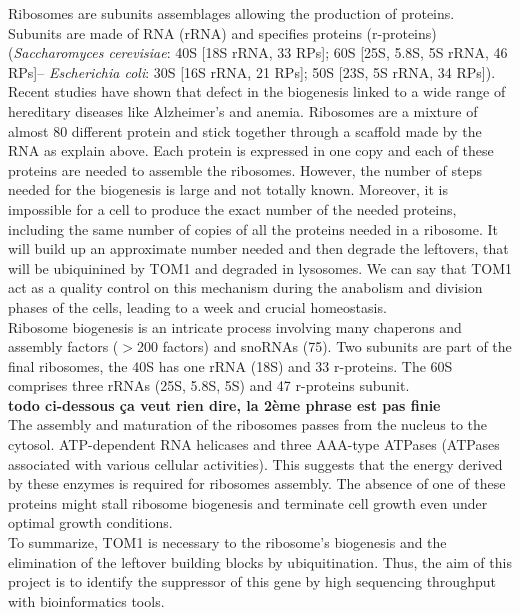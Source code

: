 \documentclass[10pt,a4paper]{article}
\begin{document}
\noindent Ribosomes are subunits assemblages allowing the production of proteins. Subunits are made of RNA (rRNA) and specifies proteins (r-proteins) (\textit{Saccharomyces cerevisiae}: 40S [18S rRNA, 33 RPs]; 60S [25S, 5.8S, 5S rRNA, 46 RPs]– \textit{Escherichia coli}: 30S [16S rRNA, 21 RPs]; 50S [23S, 5S rRNA, 34 RPs])\cite{kressler_driving_2010}. Recent studies have shown that defect in the biogenesis linked to a wide range of hereditary diseases like Alzheimer’s and anemia\cite{makioka_immunolocalization_2016}. Ribosomes are a mixture of almost 80 different protein and stick together through a scaffold made by the RNA as explain above. Each protein is expressed in one copy and each of these proteins are needed to assemble the ribosomes. However, the number of steps needed for the biogenesis is large and not totally known. Moreover, it is impossible for a cell to produce the exact number of the needed proteins, including the same number of copies of all the proteins needed in a ribosome\cite{sung_conserved_2016}. It will build up an approximate number needed and then degrade the leftovers, that will be ubiquinined by TOM1 and degraded in lysosomes. We can say that TOM1 act as a quality control on this mechanism during the anabolism and division phases of the cells, leading to a week and crucial homeostasis\cite{sung_conserved_2016}.\\

\noindent Ribosome biogenesis is an intricate process involving many chaperons and assembly factors ($>$200 factors) and snoRNAs (75)\cite{kressler_driving_2010}. Two subunits are part of the final ribosomes, the 40S has one rRNA (18S) and 33 r-proteins. The 60S comprises three rRNAs (25S, 5.8S, 5S) and 47 r-proteins subunit\cite{kressler_driving_2010}.\\

\textbf{todo ci-dessous ça veut rien dire, la 2ème phrase est pas finie}\\

\noindent The assembly and maturation of the ribosomes passes from the nucleus to the cytosol. ATP-dependent RNA helicases and three AAA-type ATPases (ATPases associated with various cellular activities). This suggests that the energy derived by these enzymes is required for ribosomes assembly. The absence of one of these proteins might stall ribosome biogenesis and terminate cell growth even under optimal growth conditions\cite{dinman_eukaryotic_2009,kressler_driving_2010}.\\

\noindent To summarize, TOM1 is necessary to the ribosome’s biogenesis and the elimination of the leftover building blocks by ubiquitination. Thus, the aim of this project is to identify the suppressor of this gene by high sequencing throughput with bioinformatics tools. \\
\end{document}
